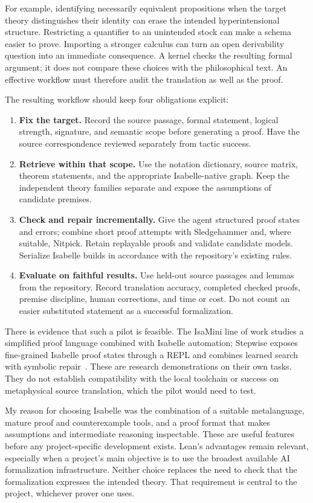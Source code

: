 \documentclass[12pt,leqno]{article}
\begin{document}
For example, identifying necessarily equivalent propositions when the target
theory distinguishes their identity can erase the intended hyperintensional
structure. Restricting a quantifier to an unintended stock can make a schema
easier to prove. Importing a stronger calculus can turn an open derivability
question into an immediate consequence. A kernel checks the resulting
formal argument; it does not compare these choices with the philosophical
text. An effective workflow must therefore audit the translation as well as
the proof.

The resulting workflow should keep four obligations explicit:
\begin{enumerate}
\item \textbf{Fix the target.} Record the source passage, formal statement,
logical strength, signature, and semantic scope before generating a proof.
Have the source correspondence reviewed separately from tactic success.
\item \textbf{Retrieve within that scope.} Use the notation dictionary,
source matrix, theorem statements, and the appropriate Isabelle-native graph.
Keep the independent theory families separate and expose the assumptions of
candidate premises.
\item \textbf{Check and repair incrementally.} Give the agent structured proof
states and errors; combine short proof attempts with Sledgehammer and, where
suitable, Nitpick. Retain replayable proofs and validate candidate models.
Serialize Isabelle builds in accordance with the repository's existing rules.
\item \textbf{Evaluate on faithful results.} Use held-out source passages and
lemmas from the repository. Record translation accuracy, completed checked
proofs, premise discipline, human corrections, and time or cost. Do not count
an easier substituted statement as a successful formalization.
\end{enumerate}

There is evidence that such a pilot is feasible. The IsaMini line of work
studies a simplified proof language combined with Isabelle automation;
Stepwise exposes fine-grained Isabelle proof states through a REPL and
combines learned search with symbolic repair~\cite{isamini,stepwise}. These
are research demonstrations on their own tasks. They do not establish
compatibility with the local toolchain or success on metaphysical source
translation, which the pilot would need to test.

My reason for choosing Isabelle was the combination of a suitable
metalanguage, mature proof and counterexample tools, and a proof format
that makes assumptions and intermediate reasoning inspectable. These are
useful features before any project-specific development exists. Lean's
advantages remain relevant, especially when a project's main objective is
to use the broadest available AI formalization infrastructure. Neither
choice replaces the need to check that the formalization expresses the
intended theory. That requirement is central to the project, whichever
prover one uses.
\end{document}
